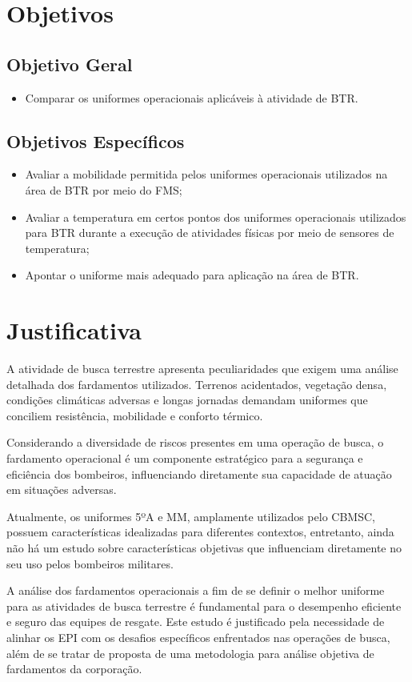 	\section{Objetivos}

		\subsection{Objetivo Geral}
			\begin{itemize}
				\item Comparar os uniformes operacionais aplicáveis à atividade de \acrlong{BTR}.
			\end{itemize}
		\subsection{Objetivos Específicos}
			\begin{itemize}
				\item Avaliar a mobilidade permitida pelos uniformes operacionais utilizados na área de \acrlong{BTR} por meio do \acrfull{FMS};
				\item Avaliar a temperatura em certos pontos dos uniformes operacionais utilizados para \acrlong{BTR} durante a execução de atividades físicas por meio de sensores de temperatura;
				\item Apontar o uniforme mais adequado para aplicação na área de \acrlong{BTR}.
			\end{itemize}
\section{Justificativa}
	
	A atividade de busca terrestre apresenta peculiaridades que exigem uma análise detalhada dos 
	fardamentos utilizados. Terrenos acidentados, vegetação densa, condições climáticas adversas 
	e longas jornadas demandam uniformes que conciliem resistência, mobilidade e conforto térmico.
	
	Considerando a diversidade de riscos presentes em uma operação de busca, o fardamento operacional é um componente estratégico para
	 a segurança e eficiência dos bombeiros, influenciando diretamente sua capacidade de atuação em situações adversas.
	
	Atualmente, os uniformes 5ºA e \acrlong{MM}, amplamente utilizados pelo \acrshort{CBMSC}, possuem características idealizadas para diferentes contextos,
	  entretanto, ainda não há um estudo sobre características objetivas que influenciam diretamente no seu uso pelos bombeiros militares.
	
	  A análise dos fardamentos operacionais a fim de se definir o melhor uniforme para as atividades de busca terrestre é fundamental 
	  para o desempenho eficiente e seguro das equipes de resgate. Este estudo é justificado pela necessidade de alinhar os 
	  \acrfull{EPI} com os desafios específicos enfrentados nas operações de busca, além de se tratar de proposta de uma metodologia
	   para análise objetiva de fardamentos da corporação.

